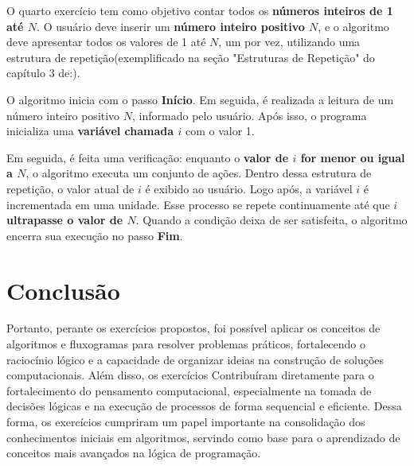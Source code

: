 \documentclass[12pt, a4paper]{article}
\begin{document}
    O quarto exercício tem como objetivo contar todos os \textbf{números inteiros de 1 até $N$}.
O usuário deve inserir um \textbf{número inteiro positivo $N$}, e o algoritmo deve apresentar
todos os valores de 1 até $N$, um por vez, utilizando uma estrutura de repetição(exemplificado na seção "Estruturas de Repetição" do capítulo 3 de:\cite{forbellone2005}).

O algoritmo inicia com o passo \textbf{Início}. Em seguida, é realizada a leitura de um número
inteiro positivo $N$, informado pelo usuário. Após isso, o programa inicializa uma \textbf{variável
chamada $i$} com o valor 1.

Em seguida, é feita uma verificação: enquanto o \textbf{valor de $i$ for menor ou igual a $N$}, o
algoritmo executa um conjunto de ações. Dentro dessa estrutura de repetição, o valor atual
de $i$ é exibido ao usuário. Logo após, a variável $i$ é incrementada em uma unidade.
Esse processo se repete continuamente até que \textbf{$i$ ultrapasse o valor de $N$}. Quando a
condição deixa de ser satisfeita, o algoritmo encerra sua execução no passo \textbf{Fim}.
\pagebreak

\section*{Conclusão}
       Portanto, perante os exercícios propostos, foi possível aplicar os conceitos de 
    algoritmos e fluxogramas para resolver problemas práticos, fortalecendo o 
    raciocínio lógico e a capacidade de organizar ideias na construção de 
    soluções computacionais. Além disso, os exercícios Contribuíram diretamente para o fortalecimento 
    do pensamento computacional, especialmente na tomada de decisões lógicas 
    e na execução de processos de forma sequencial e eficiente.
       Dessa forma, os exercícios cumpriram um papel importante na 
    consolidação dos conhecimentos iniciais em algoritmos, servindo como 
    base para o aprendizado de conceitos mais avançados na lógica de programação.


\end{document}
